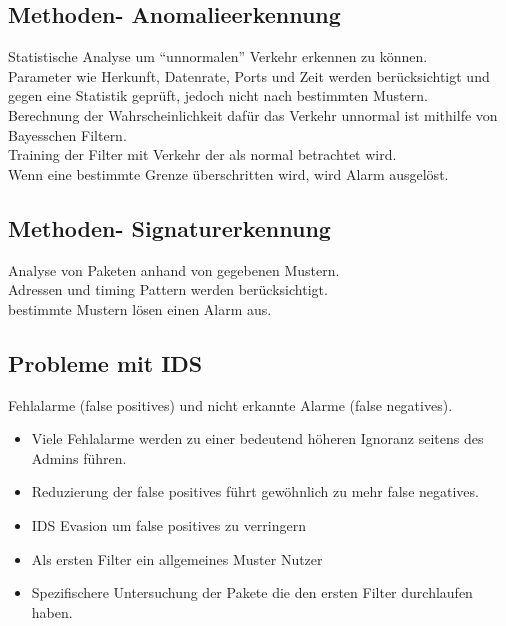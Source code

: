 \documentclass{article} %
\begin{document}
\subsection{Methoden- Anomalieerkennung}
Statistische Analyse um "`unnormalen"' Verkehr erkennen zu können.\\
Parameter wie Herkunft, Datenrate, Ports und Zeit werden berücksichtigt und gegen eine Statistik geprüft, jedoch nicht nach bestimmten Mustern.\\
Berechnung der Wahrscheinlichkeit dafür das Verkehr unnormal ist mithilfe von Bayesschen Filtern.\\
Training der Filter mit Verkehr der als normal betrachtet wird.\\
Wenn eine bestimmte Grenze überschritten wird, wird Alarm ausgelöst.\\

\subsection{Methoden- Signaturerkennung}
Analyse von Paketen anhand von gegebenen Mustern.\\
Adressen und timing Pattern werden berücksichtigt.\\
bestimmte Mustern lösen einen Alarm aus.

\subsection{Probleme mit IDS}
Fehlalarme (false positives) und nicht erkannte Alarme (false negatives).\\
\begin{itemize}
	\item Viele Fehlalarme werden zu einer bedeutend höheren Ignoranz seitens des Admins führen.
    \item Reduzierung der false positives führt gewöhnlich zu mehr false negatives.
    \item IDS Evasion um false positives zu verringern
    \item Als ersten Filter ein allgemeines Muster Nutzer
    \item Spezifischere Untersuchung der Pakete die den ersten Filter durchlaufen haben.
\end{itemize}
\end{document}
